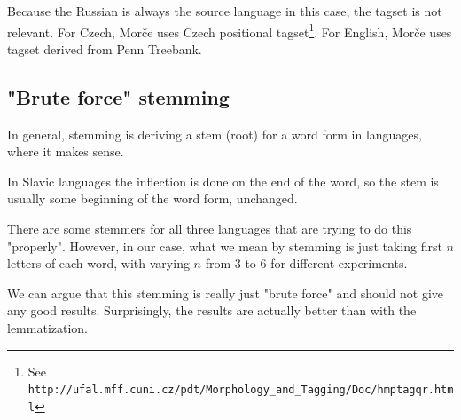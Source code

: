 \documentclass[11pt,letterpaper]{article}
\begin{document}
Because the Russian is always the source language in this case, the tagset is not relevant. For Czech, Morče uses Czech positional tagset\footnote{See \texttt{http://ufal.mff.cuni.cz/pdt/\-Mor\-pho\-logy\-\_\-and\-\_\-Tag\-ging\-/\-Doc/hmptagqr.html}}. For English, Morče uses tagset derived from Penn Treebank.

\subsection{"Brute force" stemming}
In general, stemming is deriving a stem (root) for a word form in languages, where it makes sense.

In Slavic languages the inflection is done on the end of the word, so the stem is usually some beginning of the word form, unchanged.

There are some stemmers for all three languages that are trying to do this "properly". However, in our case, what we mean by stemming is just taking first $n$ letters of each word, with varying $n$ from 3 to 6 for different experiments.

We can argue that this stemming is really just "brute force" and should not give any good results. Surprisingly, the results are actually better than with the lemmatization.

\end{document}
